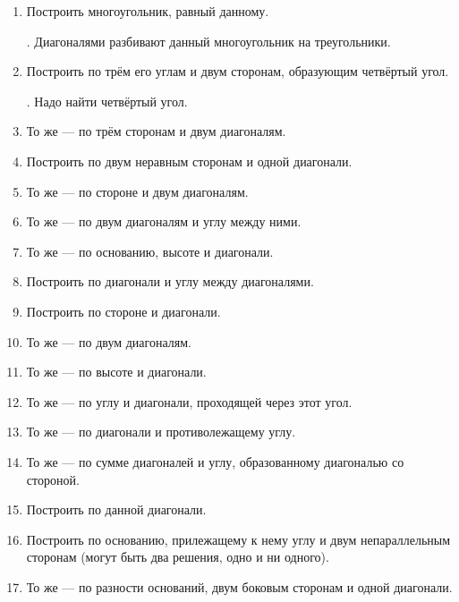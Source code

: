 {\begin{enumerate}
\item
Построить многоугольник, равный данному.

\smallskip
{}.
Диагоналями разбивают данный многоугольник на треугольники.

\item
Построить  по трём его углам и двум сторонам, образующим четвёртый угол.

\smallskip
{}.
Надо найти четвёртый угол.

\item
То же — по трём сторонам и двум диагоналям.

\item
Построить  по двум неравным сторонам и одной диагонали.

\item
То же — по стороне и двум диагоналям.

\item
То же — по двум диагоналям и углу между ними.

\item
То же — по основанию, высоте и диагонали.

\item
Построить  по диагонали и углу между диагоналями.

\item
Построить  по стороне и диагонали.

\item
То же — по двум диагоналям.

\item
То же — по высоте и диагонали.

\item
То же — по углу и диагонали, проходящей через этот угол.

\item
То же — по диагонали и противолежащему углу.

\item
То же — по сумме диагоналей и углу, образованному диагональю со стороной.

\item
Построить  по данной диагонали.

\item
Построить  по основанию, прилежащему к нему углу и двум непараллельным сторонам (могут быть два решения, одно и ни одного).

\item
То же — по разности оснований, двум боковым сторонам и одной диагонали.


\end{enumerate}}
